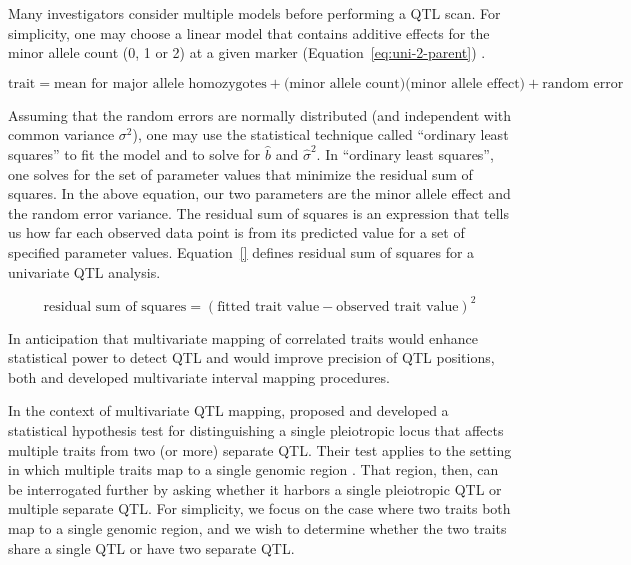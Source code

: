 \documentclass[]{article}\usepackage[]{graphicx}\usepackage[]{color}
\begin{document}
Many investigators consider multiple models before performing a QTL scan.
For simplicity, one may choose a linear model that contains additive effects for
the  minor allele count (0, 1 or 2) at a given marker (Equation~\ref{eq:uni-2-parent}) \citep{martinez1992estimating,haley1992simple}.

\begin{equation}
\text{trait} = \text{mean for major allele homozygotes} + \text{(minor allele count)}\text{(minor allele effect)} + \text{random error}
\label{eq:uni-2-parent}
\end{equation}

Assuming that the random errors are normally distributed (and independent with common
variance $\sigma^2$), one may use the statistical technique called ``ordinary least squares''
to fit the model and to solve for $\hat b$ and $\hat \sigma^2$.
In ``ordinary least squares'', one solves for the set of parameter values that
minimize the residual sum of squares. In the above equation, our two parameters are the minor allele effect and the random error variance. The residual sum of squares is an expression that tells us how far each observed data point is from its predicted value for a set of specified parameter values. Equation~\ref{} defines residual sum of squares for a univariate QTL analysis.

\begin{equation}
\text{residual sum of squares} = \left(\text{fitted trait value} - \text{observed trait value}\right)^2
\end{equation}














In anticipation that multivariate mapping of correlated traits would enhance statistical power to detect QTL and would improve precision of QTL positions, both \citet{jiang1995multiple} and \citet{korol1995interval} developed multivariate interval mapping procedures. 

In the context of multivariate QTL mapping, \citet{jiang1995multiple} 
proposed and developed a statistical hypothesis test for distinguishing
a single pleiotropic locus that affects multiple traits from two (or more)
separate QTL.
Their test applies to the setting in which multiple traits
map to a single genomic region \citep{jiang1995multiple}. 
That region, then, can be interrogated further by asking whether it
harbors a single pleiotropic QTL or multiple separate QTL. For simplicity, we focus on the case where two traits both map to a single genomic region, and we wish to determine whether the two traits share a single QTL or have two separate QTL. 
\end{document}
